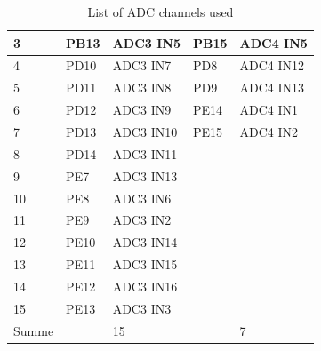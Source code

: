 \begin{table}[]
\begin{tabular}{@{}lllll@{}}
\multicolumn{1}{|l|}{\cellcolor[HTML]{EFEFEF}3} & \multicolumn{1}{l|}{PB13} & \multicolumn{1}{l|}{ADC3 IN5} & \multicolumn{1}{l|}{PB15} & \multicolumn{1}{l|}{ADC4 IN5} \\ \midrule
\multicolumn{1}{|l|}{\cellcolor[HTML]{EFEFEF}4} & \multicolumn{1}{l|}{PD10} & \multicolumn{1}{l|}{ADC3 IN7} & \multicolumn{1}{l|}{PD8} & \multicolumn{1}{l|}{ADC4 IN12} \\ \midrule
\multicolumn{1}{|l|}{\cellcolor[HTML]{EFEFEF}5} & \multicolumn{1}{l|}{PD11} & \multicolumn{1}{l|}{ADC3 IN8} & \multicolumn{1}{l|}{PD9} & \multicolumn{1}{l|}{ADC4 IN13} \\ \midrule
\multicolumn{1}{|l|}{\cellcolor[HTML]{EFEFEF}6} & \multicolumn{1}{l|}{PD12} & \multicolumn{1}{l|}{ADC3 IN9} & \multicolumn{1}{l|}{PE14} & \multicolumn{1}{l|}{ADC4 IN1} \\ \midrule
\multicolumn{1}{|l|}{\cellcolor[HTML]{EFEFEF}7} & \multicolumn{1}{l|}{PD13} & \multicolumn{1}{l|}{ADC3 IN10} & \multicolumn{1}{l|}{PE15} & \multicolumn{1}{l|}{ADC4 IN2} \\ \midrule
\multicolumn{1}{|l|}{\cellcolor[HTML]{EFEFEF}8} & \multicolumn{1}{l|}{PD14} & \multicolumn{1}{l|}{ADC3 IN11} & \multicolumn{1}{l|}{} & \multicolumn{1}{l|}{} \\ \midrule
\multicolumn{1}{|l|}{\cellcolor[HTML]{EFEFEF}9} & \multicolumn{1}{l|}{PE7} & \multicolumn{1}{l|}{ADC3 IN13} & \multicolumn{1}{l|}{} & \multicolumn{1}{l|}{} \\ \midrule
\multicolumn{1}{|l|}{\cellcolor[HTML]{EFEFEF}10} & \multicolumn{1}{l|}{PE8} & \multicolumn{1}{l|}{ADC3 IN6} & \multicolumn{1}{l|}{} & \multicolumn{1}{l|}{} \\ \midrule
\multicolumn{1}{|l|}{\cellcolor[HTML]{EFEFEF}11} & \multicolumn{1}{l|}{PE9} & \multicolumn{1}{l|}{ADC3 IN2} & \multicolumn{1}{l|}{} & \multicolumn{1}{l|}{} \\ \midrule
\multicolumn{1}{|l|}{\cellcolor[HTML]{EFEFEF}12} & \multicolumn{1}{l|}{PE10} & \multicolumn{1}{l|}{ADC3 IN14} & \multicolumn{1}{l|}{} & \multicolumn{1}{l|}{} \\ \midrule
\multicolumn{1}{|l|}{\cellcolor[HTML]{EFEFEF}13} & \multicolumn{1}{l|}{PE11} & \multicolumn{1}{l|}{ADC3 IN15} & \multicolumn{1}{l|}{} & \multicolumn{1}{l|}{} \\ \midrule
\multicolumn{1}{|l|}{\cellcolor[HTML]{EFEFEF}14} & \multicolumn{1}{l|}{PE12} & \multicolumn{1}{l|}{ADC3 IN16} & \multicolumn{1}{l|}{} & \multicolumn{1}{l|}{} \\ \midrule
\multicolumn{1}{|l|}{\cellcolor[HTML]{EFEFEF}15} & \multicolumn{1}{l|}{PE13} & \multicolumn{1}{l|}{ADC3 IN3} & \multicolumn{1}{l|}{} & \multicolumn{1}{l|}{} \\ \midrule
\rowcolor[HTML]{EFEFEF} 
Summe &  & 15 &  & 7 \\ \bottomrule
 
\end{tabular}
	\caption{List of ADC channels used}
	\label{tab:4.1}
\end{table}

